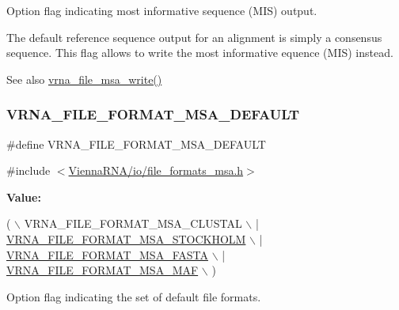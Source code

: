 Option flag indicating most informative sequence (M\+IS) output. 

The default reference sequence output for an alignment is simply a consensus sequence. This flag allows to write the most informative equence (M\+IS) instead.

\begin{DoxySeeAlso}{See also}
\hyperlink{group__file__formats__msa_ga0c90faf1515ce0b16620036b1055ff1e}{vrna\+\_\+file\+\_\+msa\+\_\+write()} 
\end{DoxySeeAlso}
\mbox{\label{group__file__formats__msa_ga4acc255373831856a8417b68de8a94c0}} 
\subsubsection{\texorpdfstring{V\+R\+N\+A\+\_\+\+F\+I\+L\+E\+\_\+\+F\+O\+R\+M\+A\+T\+\_\+\+M\+S\+A\+\_\+\+D\+E\+F\+A\+U\+LT}{VRNA\_FILE\_FORMAT\_MSA\_DEFAULT}}
{\footnotesize\ttfamily \#define V\+R\+N\+A\+\_\+\+F\+I\+L\+E\+\_\+\+F\+O\+R\+M\+A\+T\+\_\+\+M\+S\+A\+\_\+\+D\+E\+F\+A\+U\+LT}



{\ttfamily \#include $<$\hyperlink{io_2file__formats__msa_8h}{Vienna\+R\+N\+A/io/file\+\_\+formats\+\_\+msa.\+h}$>$}

{\bfseries Value\+:}
\begin{DoxyCode}
( \(\backslash\)
    VRNA\_FILE\_FORMAT\_MSA\_CLUSTAL \(\backslash\)
    | \hyperlink{group__file__formats__msa_ga62be992445cd8ab2ad7a8fded944338b}{VRNA\_FILE\_FORMAT\_MSA\_STOCKHOLM} \(\backslash\)
    | \hyperlink{group__file__formats__msa_gacf6274a2c825f34e4131404665b00604}{VRNA\_FILE\_FORMAT\_MSA\_FASTA} \(\backslash\)
    | \hyperlink{group__file__formats__msa_gab3186d774c01570d2a47d0308eec4927}{VRNA\_FILE\_FORMAT\_MSA\_MAF} \(\backslash\)
    )
\end{DoxyCode}


Option flag indicating the set of default file formats. 

